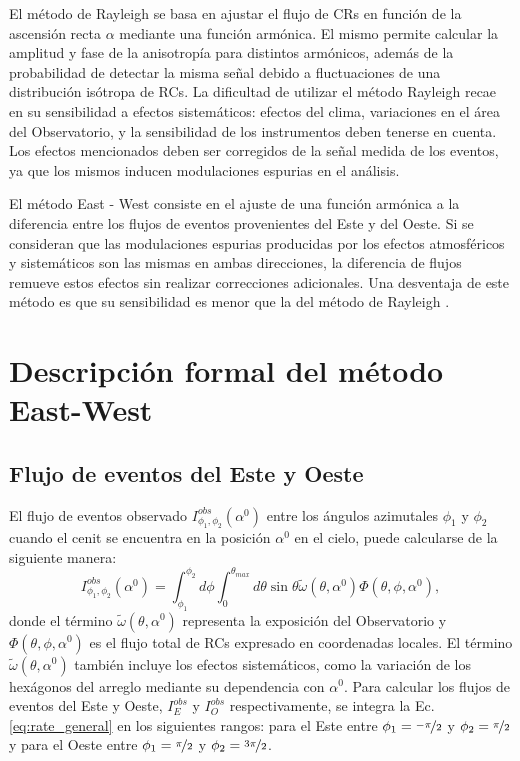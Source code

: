 

El método de Rayleigh se basa en ajustar el flujo de CRs en función de la ascensión recta $\alpha$ mediante una función armónica. El mismo permite calcular la amplitud y fase de la anisotropía para distintos armónicos, además de la probabilidad de detectar la misma señal debido a fluctuaciones de una distribución isótropa de RCs. La dificultad de utilizar el método Rayleigh recae en su sensibilidad a efectos sistemáticos: efectos del clima, variaciones en el área del Observatorio, y la sensibilidad de los instrumentos deben tenerse en cuenta.  Los efectos mencionados deben ser corregidos de la señal medida de los eventos, ya que los mismos inducen modulaciones espurias en el análisis.

El método East - West consiste en el ajuste de una función armónica a la diferencia entre los flujos de eventos provenientes del Este y del Oeste. Si se consideran que las modulaciones espurias producidas por los efectos atmosféricos y sistemáticos son las mismas en ambas direcciones, la diferencia de flujos remueve estos efectos sin realizar correcciones adicionales. Una desventaja de este método es que su sensibilidad es menor que la del método de Rayleigh \cite{taborda}.


\section{Descripción formal del método East-West}
 

    \subsection{Flujo de eventos del Este y Oeste}
    El flujo de eventos observado $I_{\phi_1, \phi_2}^{obs}(\alpha^0)$  entre los ángulos azimutales $\phi_1$ y $\phi_2$ cuando el cenit se encuentra en la posición  $\alpha^0$ en el cielo,  puede calcularse  de la siguiente manera:
    \begin{equation}
        I_{\phi_1, \phi_2}^{obs}(\alpha^0) = \int_{\phi_1}^{\phi_2} d\phi \int_{0}^{\theta_{max}} d\theta \sin\theta \tilde{\omega}(\theta, \alpha^0) \Phi(\theta, \phi, \alpha^0),
        \label{eq:rate_general}
    \end{equation}
    \noindent  donde  el término $\tilde{\omega}(\theta, \alpha^0)$ representa la exposición del Observatorio y $\Phi(\theta, \phi, \alpha^0)$ es el flujo total de RCs expresado en coordenadas locales. El término $\tilde{\omega}(\theta, \alpha^0)$  también incluye los efectos sistemáticos, como la variación de los hexágonos del arreglo mediante  su dependencia con $\alpha^0$. Para calcular los flujos de eventos del Este y Oeste, $I^{obs}_E$ y $I_O^{obs}$ respectivamente, se integra la Ec.\ref{eq:rate_general} en los siguientes  rangos: para el Este entre $\phi_1=\nicefrac{-\pi}{2}$ y $\phi_2=\nicefrac{\pi}{2}$ y para el Oeste entre $\phi_1=\nicefrac{\pi}{2}$ y $\phi_2=\nicefrac{3\pi}{2}$.

